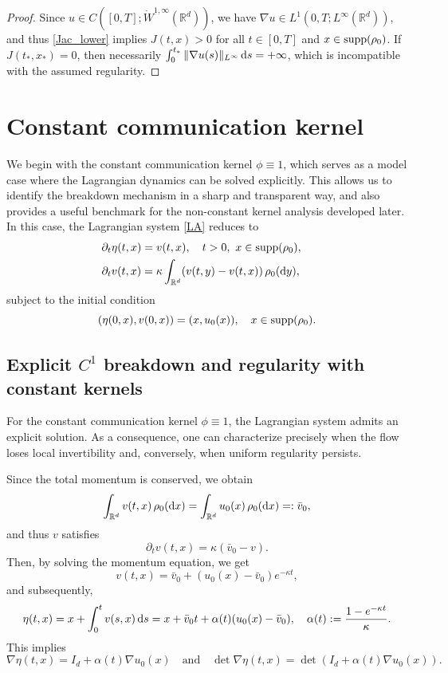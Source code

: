 \documentclass[11pt]{amsart}
\numberwithin{equation}{section}
\theoremstyle{definition}
\theoremstyle{remark}
\numberwithin{equation}{section}
\newcommand{\R}{\mathbb R}
\newcommand{\bq}{\begin{equation}}
\newcommand{\eq}{\end{equation}}
\newcommand{\lt}{\left}
\newcommand{\rt}{\right}
\newcommand{\pa}{\partial}
\newcommand{\intr}{\int_{\R^d}}
\newcommand{\dx}{\textnormal{d}x}
\newcommand{\dy}{\textnormal{d}y}
\newcommand{\ds}{\textnormal{d}s}
\newcommand{\supp}{{\rm supp}}
\begin{document}
\begin{proof}
Since $u\in C([0,T];\dot W^{1,\infty}(\R^d))$, we have $\nabla u\in L^1(0,T;L^\infty(\R^d))$, and thus \eqref{Jac_lower} implies $J(t,x)>0$ for all $t\in[0,T]$ and $x\in\supp(\rho_0)$. If $J(t_*,x_*)=0$, then necessarily $\int_0^{t_*}\|\nabla u(s)\|_{L^\infty}\,\ds=+\infty$, which is incompatible with the assumed regularity.
\end{proof}

 
%
%
%                       
%
%
\section{Constant communication kernel}\label{sec:const}

We begin with the constant communication kernel $\phi\equiv1$, which serves as a model case where the Lagrangian dynamics can be solved explicitly. This allows us to identify the breakdown mechanism in a sharp and transparent way, and also provides a useful benchmark for the non-constant kernel analysis developed later.  In this case, the Lagrangian system \eqref{LA} reduces to
 \begin{align}\label{LA:const}
\begin{aligned}
&\pa_t \eta(t,x) = v(t,x), \quad t>0, \ x \in \supp(\rho_0), \cr
&\pa_t v(t,x)  = \kappa \intr   (v(t,y) - v(t,x))\,\rho_0(\dy),
\end{aligned}
\end{align}
subject to the initial condition
\[
(\eta(0,x), v(0,x)) = (x, u_0(x)), \quad x \in \supp(\rho_0).
\]

%
%
%                       
%
%
\subsection{Explicit $C^1$ breakdown and regularity with constant kernels} 

For the constant communication kernel $\phi\equiv1$, the Lagrangian system admits an explicit solution. As a consequence, one can characterize precisely when the flow loses local invertibility and, conversely, when uniform regularity persists.

Since the total momentum is conserved, we obtain
\[
\intr v(t,x)\,\rho_0(\dx) = \intr u_0(x)\,\rho_0(\dx) =: \bar v_0,
\]
and thus $v$ satisfies
\[
\pa_t v(t,x) = \kappa (\bar v_0 - v).
\]
Then, by solving the momentum equation, we get
\[
v(t,x) = \bar v_0 + (u_0(x)  - \bar v_0) e^{-\kappa t},
\]
and subsequently, 
\[
\eta(t,x) = x + \int_0^t v(s,x)\,\ds = x + \bar v_0 t + \alpha(t) (u_0(x)  - \bar v_0), \quad \alpha(t) := \frac{1 - e^{-\kappa t}}{\kappa}.
\]
This implies
\bq\label{expl_con}
\nabla \eta(t,x) = I_d + \alpha(t) \nabla u_0(x) \quad \text{and} \quad \det \nabla \eta(t,x) = \det \lt( I_d + \alpha(t) \nabla u_0(x)\rt).
\eq
\end{document}
